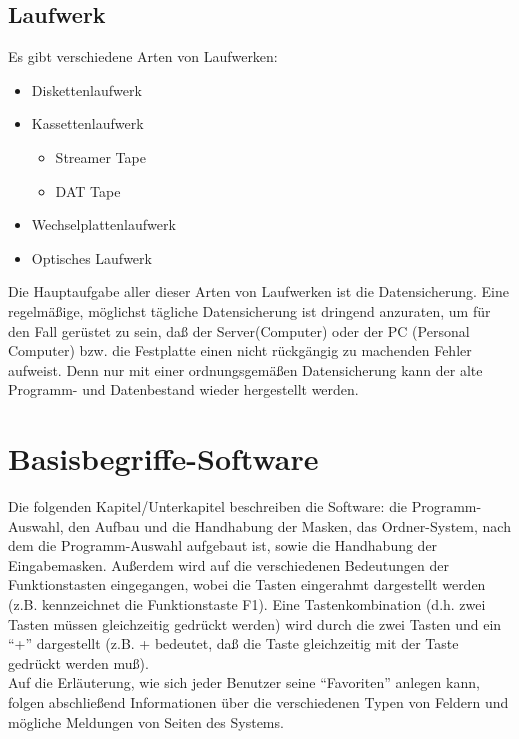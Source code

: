 \section{Laufwerk}   

Es gibt verschiedene Arten von Laufwerken:

\begin{itemize}
\item Diskettenlaufwerk
\item Kassettenlaufwerk
\begin{itemize}
\item Streamer Tape
\item DAT Tape
\end{itemize}
\item Wechselplattenlaufwerk
\item Optisches Laufwerk
\end{itemize}

Die Hauptaufgabe aller dieser Arten von Laufwerken ist die Datensicherung.
Eine regelm\"{a}{\ss}ige, m\"{o}glichst t\"{a}gliche Datensicherung ist
dringend anzuraten, um f\"{u}r den Fall ger\"{u}stet zu sein, da{\ss} der
Server(Computer) oder der PC (Personal Computer) bzw. die Festplatte einen
nicht r\"{u}ckg\"{a}ngig zu machenden Fehler aufweist. Denn nur mit einer
ordnungsgem\"{a}{\ss}en Datensicherung kann der alte Programm- und Datenbestand
wieder hergestellt werden.

\cleardoublepage

\chapter{Basisbegriffe-Software}

Die folgenden Kapitel/Unterkapitel beschreiben die Software: die
Programm-Auswahl, den Aufbau und die Handhabung der Masken, das
Ordner-System, nach dem die Programm-Auswahl aufgebaut ist, sowie die
Handhabung der Eingabemasken. Au{\ss}erdem wird auf die verschiedenen
Bedeutungen der Funktionstasten eingegangen, wobei die Tasten
eingerahmt dargestellt werden (z.B. kennzeichnet  die
Funktionstaste F1).  Eine Tastenkombination (d.h. zwei Tasten
m\"{u}ssen gleichzeitig gedr\"{u}ckt werden) wird durch die zwei
Tasten und ein ``+'' dargestellt (z.B. +
bedeutet, da{\ss} die Taste  gleichzeitig mit der Taste
 gedr\"{u}ckt werden mu{\ss}).\\ Auf die Erl\"{a}uterung,
wie sich jeder Benutzer seine ``Favoriten'' anlegen kann, folgen
abschlie{\ss}end Informationen \"{u}ber die verschiedenen Typen von
Feldern und m\"{o}gliche Meldungen von Seiten des Systems.

